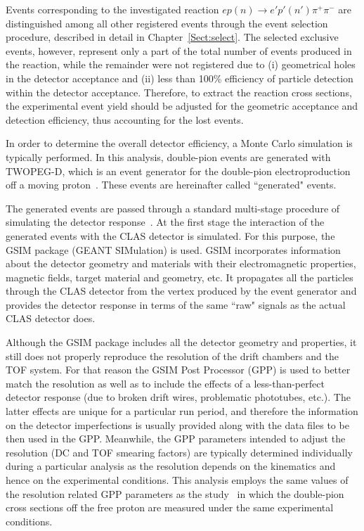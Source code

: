 Events corresponding to the investigated reaction $ep(n) \rightarrow e'p'(n')\pi^{+}\pi^{-}$ are distinguished among all other registered events through the event selection procedure, described in detail in Chapter~\ref{Sect:select}. The selected exclusive events,  however, represent only a part of the total number of events produced in the reaction, while the remainder were not registered due to (i) geometrical holes in the detector acceptance and (ii) less than 100\% efficiency of particle detection within the detector acceptance. Therefore, to extract the reaction cross sections, the experimental event yield should be adjusted for the geometric acceptance and detection efficiency, thus accounting for the lost events.


In order to determine the overall detector efficiency, a Monte Carlo simulation is typically performed. In this analysis, double-pion events are generated with TWOPEG-D, which is an event generator for the double-pion electroproduction off a moving proton~\cite{twopeg-d}. These events are hereinafter called ``generated" events. 

The generated events are passed through a standard multi-stage procedure of simulating the detector response~\cite{Mecking:2003zu}. At the first stage the interaction of the generated events with the CLAS detector is simulated. For this purpose, the GSIM package (GEANT SIMulation) is used. GSIM incorporates information about the detector geometry and materials with their electromagnetic properties, magnetic fields, target material and geometry, etc. It  propagates all the particles through the CLAS detector from the vertex produced by the event generator and provides the detector response in terms of the same ``raw" signals as the actual CLAS detector does.

Although the GSIM package includes all the detector geometry and properties, it still does not properly reproduce the resolution of the drift chambers and the TOF system. For that reason the GSIM Post Processor (GPP) is used to better match the resolution as well as to include the effects of a less-than-perfect detector response (due to broken drift wires, problematic phototubes, etc.). The latter effects are unique for a particular run period, and therefore the information on the detector imperfections is usually provided along with the data files to be then used in the GPP. Meanwhile, the GPP parameters intended to adjust the resolution (DC and TOF smearing factors) are typically determined individually during a particular analysis as the resolution depends on the kinematics and hence on the experimental conditions. This analysis employs the same values of the resolution related GPP parameters as the study~\cite{Fed_an_note:2017,Fed_paper_2018} in which the double-pion cross sections off the free proton are measured under the same experimental conditions.



